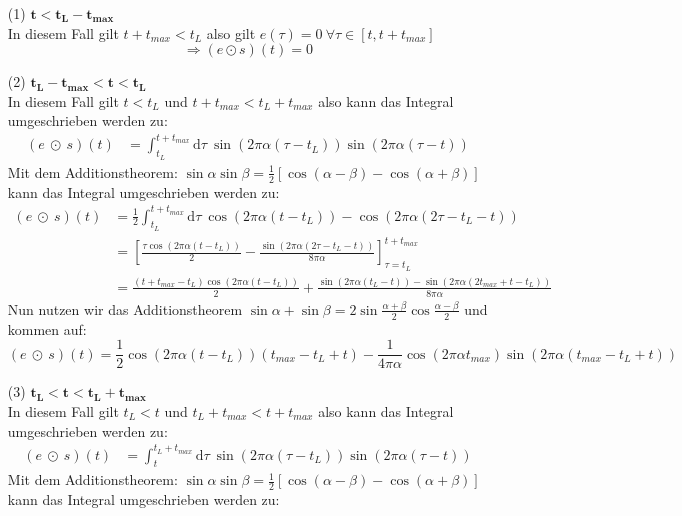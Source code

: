 \documentclass[ngerman]{scrartcl}
\begin{document}
\begin{itemize}
	\item [(1)] {$\mathbf{t<t_L-t_{max}}$}\\
	In diesem Fall gilt $t+t_{max}<t_L$
	also gilt $e(\tau)=0~\forall\tau\in[t,t+t_{max}]$
	\begin{equation*}
		\Rightarrow(e \odot s)(t)=0
	\end{equation*}
	\item [(2)] {$\mathbf{t_L-t_{max}<t<t_L}$}\\
	In diesem Fall gilt $t<t_L$ und $t+t_{max}<t_L+t_{max}$
	also kann das Integral umgeschrieben werden zu:
	\begin{align*}
		(e ~\odot~ s)(t)&=\int_{t_L}^{t+t_{max}} \mathrm{d} \tau~ \sin(2\pi\alpha(\tau-t_L)) \sin(2\pi\alpha(\tau-t))
	\end{align*}
	Mit dem Additionstheorem: $\sin \alpha \sin \beta = \frac{1}{2} \left[ \cos(\alpha-\beta) - \cos (\alpha+\beta) \right]$
	kann das Integral umgeschrieben werden zu:
	\begin{align*}
		(e ~\odot~ s)(t)&=\frac{1}{2}\int_{t_L}^{t+t_{max}} \mathrm{d} \tau~ \cos(2\pi\alpha(t-t_L))-\cos(2\pi\alpha(2\tau-t_L-t))\\
		&=\left[\frac{\tau\cos(2\pi\alpha(t-t_L))}{2}-\frac{\sin(2\pi\alpha(2\tau-t_L-t))}{8\pi\alpha}\right]_{\tau=t_L}^{t+t_{max}}\\
		&=\frac{(t+t_{max}-t_L)\cos(2\pi\alpha(t-t_L))}{2}+\frac{\sin(2\pi\alpha(t_L-t))-\sin(2\pi\alpha(2t_{max}+t-t_L))}{8\pi\alpha}
	\end{align*}
	Nun nutzen wir das Additionstheorem $\sin \alpha +\sin \beta = 2 \sin \frac{\alpha + \beta}{2} \cos \frac{\alpha - \beta}{2}$ und kommen auf:
	\begin{equation*}
		(e ~\odot~ s)(t)=\frac{1}{2}\cos(2\pi\alpha(t-t_L))(t_{max}-t_L+t)-\frac{1}{4\pi\alpha}\cos(2\pi\alpha t_{max})\sin(2\pi\alpha(t_{max}-t_L+t))
	\end{equation*}
	\item [(3)] {$\mathbf{t_L<t<t_L+t_{max}}$}\\
	In diesem Fall gilt $t_L<t$ und $t_L+t_{max}<t+t_{max}$
	also kann das Integral umgeschrieben werden zu:
	\begin{align*}
		(e ~\odot~ s)(t)&=\int_{t}^{t_L+t_{max}} \mathrm{d} \tau~ \sin(2\pi\alpha(\tau-t_L)) \sin(2\pi\alpha(\tau-t))
	\end{align*}
	Mit dem Additionstheorem: $\sin \alpha \sin \beta = \frac{1}{2} \left[ \cos(\alpha-\beta) - \cos (\alpha+\beta) \right]$
	kann das Integral umgeschrieben werden zu:

\end{itemize}
\end{document}
